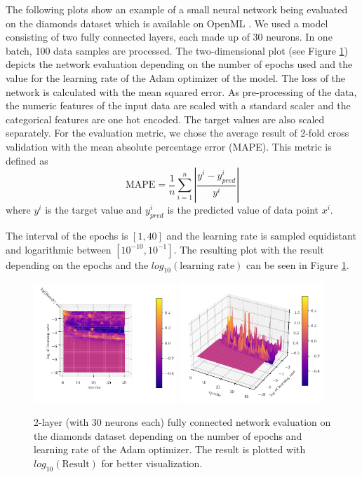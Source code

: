 The following plots show an example of a small neural network being evaluated on the diamonds dataset which is available on OpenML \cite{feurer-arxiv19a}. We used a model consisting of two fully connected layers, each made up of 30 neurons. In one batch, 100 data samples are processed. The two-dimensional plot (see Figure \ref{fig:analysis_model_training}) depicts the network evaluation depending on the number of epochs used and the value for the learning rate of the Adam optimizer of the model. The loss of the network is calculated with the mean squared error. As pre-processing of the data, the numeric features of the input data are scaled with a standard scaler and the categorical features are one hot encoded. The target values are also scaled separately. For the evaluation metric, we chose the average result of 2-fold cross validation with the mean absolute percentage error (MAPE). This metric is defined as 
\begin{equation}
 	\text{MAPE} = \frac{1}{n} \sum_{i=1}^{n}\left|\frac{y^i - y^i_{pred}}{y^i}\right|
\end{equation}
where $ y^i $ is the target value and $ y^i_{pred} $ is the predicted value of data point $ x^i $.

The interval of the epochs is $ [1, 40] $ and the learning rate is sampled equidistant and logarithmic between $ [10^{-10}, 10^{-1}] $. The resulting plot with the result depending on the epochs and the $ log_{10}(\text{learning rate}) $ can be seen in Figure \ref{fig:analysis_model_training}.

\begin{figure}[H]
	\centering
	\includegraphics[width=0.48\textwidth]{figures/Results/Machine_learning/1000_evaluations/Network_above}
	\includegraphics[width=0.48\textwidth]{figures/Results/Machine_learning/1000_evaluations/Network_normal}
	
	\caption{ 2-layer (with 30 neurons each) fully connected network evaluation on the diamonds dataset depending on the number of epochs and learning rate of the Adam optimizer. The result is plotted with $ log_{10}(\text{Result}) $ for better visualization. }
	\label{fig:analysis_model_training}
\end{figure}

